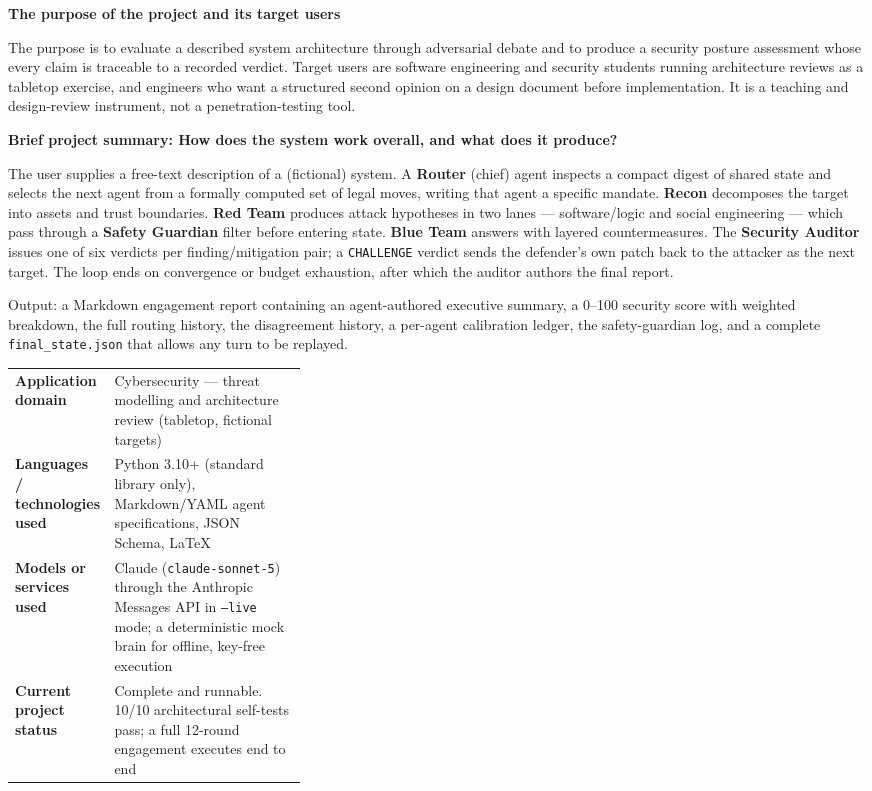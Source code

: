 \documentclass[11pt,a4paper]{article}
\newcommand{\qa}[2]{\textbf{#1}\par\vspace{-2pt}\begin{answerbox}#2\end{answerbox}}
\begin{document}
\qa{The purpose of the project and its target users}{%
The purpose is to evaluate a described system architecture through adversarial debate and
to produce a security posture assessment whose every claim is traceable to a recorded
verdict. Target users are software engineering and security students running architecture
reviews as a tabletop exercise, and engineers who want a structured second opinion on a
design document before implementation. It is a teaching and design-review instrument, not
a penetration-testing tool.}

\qa{Brief project summary: How does the system work overall, and what does it produce?}{%
The user supplies a free-text description of a (fictional) system. A \textbf{Router}
(chief) agent inspects a compact digest of shared state and selects the next agent from a
formally computed set of legal moves, writing that agent a specific mandate.
\textbf{Recon} decomposes the target into assets and trust boundaries. \textbf{Red Team}
produces attack hypotheses in two lanes --- software/logic and social engineering ---
which pass through a \textbf{Safety Guardian} filter before entering state. \textbf{Blue
Team} answers with layered countermeasures. The \textbf{Security Auditor} issues one of
six verdicts per finding/mitigation pair; a \texttt{CHALLENGE} verdict sends the
defender's own patch back to the attacker as the next target. The loop ends on
convergence or budget exhaustion, after which the auditor authors the final report.

Output: a Markdown engagement report containing an agent-authored executive summary, a
0--100 security score with weighted breakdown, the full routing history, the disagreement
history, a per-agent calibration ledger, the safety-guardian log, and a complete
\texttt{final\_state.json} that allows any turn to be replayed.}

\begin{tabularx}{\linewidth}{@{}L{0.34\linewidth}Y@{}}
\textbf{Application domain} & Cybersecurity --- threat modelling and architecture review (tabletop, fictional targets) \\
\textbf{Languages / technologies used} & Python 3.10+ (standard library only), Markdown/YAML agent specifications, JSON Schema, LaTeX \\
\textbf{Models or services used} & Claude (\texttt{claude-sonnet-5}) through the Anthropic Messages API in \texttt{--live} mode; a deterministic mock brain for offline, key-free execution \\
\textbf{Current project status} & Complete and runnable. 10/10 architectural self-tests pass; a full 12-round engagement executes end to end \\
\end{tabularx}
\end{document}
